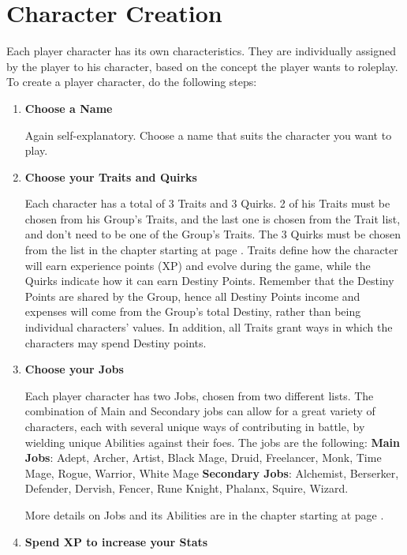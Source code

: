 \section{Character Creation}\label{sec:creation}
\begin{multicols}{2}
Each player character has its own characteristics. They are individually assigned by the player to his character, based on the concept the player wants to roleplay. To create a player character, do the following steps:
\begin{enumerate}
\item \textbf{Choose a Name}

Again self-explanatory. Choose a name that suits the character you want to play.

\item \textbf{Choose your Traits and Quirks}

Each character has a total of 3 Traits and 3 Quirks. 2 of his Traits must be chosen from his Group’s Traits, and the last one is chosen from the Trait list, and don’t need to be one of the Group's Traits. The 3 Quirks must be chosen from the list in the \pageref{ch:characters} chapter starting at page \pageref{subsec:quirklist}. Traits define how the character will earn experience points (XP) and evolve during the game, while the Quirks indicate how it can earn Destiny Points. Remember that the Destiny Points are shared by the Group, hence all Destiny Points income and expenses will come from the Group's total Destiny, rather than being individual characters’ values. In addition, all Traits grant ways in which the characters may spend Destiny points.

\item \textbf{Choose your Jobs}

Each player character has two Jobs, chosen from two different lists. The combination of Main and Secondary jobs can allow for a great variety of characters, each with several unique ways of contributing in battle, by wielding unique Abilities against their foes. The jobs are the following:
\textbf{Main Jobs}: Adept, Archer, Artist, Black Mage, Druid, Freelancer, Monk, Time Mage, Rogue, Warrior, White Mage
\textbf{Secondary Jobs}: Alchemist, Berserker, Defender, Dervish, Fencer, Rune Knight, Phalanx, Squire, Wizard.

More details on Jobs and its Abilities are in the  chapter starting at page \pageref{sec:jobs-summary}.

\item \textbf{Spend XP to increase your Stats}


\end{enumerate}
\end{multicols}
